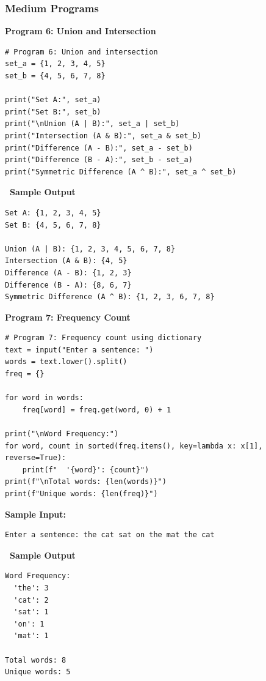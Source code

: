 \documentclass[12pt,a4paper]{article}
\newcommand{\outhead}{\noindent\colorbox{cmrgreen!25}%
  {\textbf{\small\color{cmrdark}~Sample Output~}}\par\vspace{-1pt}}
\begin{document}
\subsubsection{Medium Programs}

\textbf{Program 6: Union and Intersection}

\begin{lstlisting}
# Program 6: Union and intersection
set_a = {1, 2, 3, 4, 5}
set_b = {4, 5, 6, 7, 8}

print("Set A:", set_a)
print("Set B:", set_b)
print("\nUnion (A | B):", set_a | set_b)
print("Intersection (A & B):", set_a & set_b)
print("Difference (A - B):", set_a - set_b)
print("Difference (B - A):", set_b - set_a)
print("Symmetric Difference (A ^ B):", set_a ^ set_b)
\end{lstlisting}

\outhead
\begin{lstlisting}[style=outputstyle]
Set A: {1, 2, 3, 4, 5}
Set B: {4, 5, 6, 7, 8}

Union (A | B): {1, 2, 3, 4, 5, 6, 7, 8}
Intersection (A & B): {4, 5}
Difference (A - B): {1, 2, 3}
Difference (B - A): {8, 6, 7}
Symmetric Difference (A ^ B): {1, 2, 3, 6, 7, 8}
\end{lstlisting}

\vspace{0.5cm}

\textbf{Program 7: Frequency Count}

\begin{lstlisting}
# Program 7: Frequency count using dictionary
text = input("Enter a sentence: ")
words = text.lower().split()
freq = {}

for word in words:
    freq[word] = freq.get(word, 0) + 1

print("\nWord Frequency:")
for word, count in sorted(freq.items(), key=lambda x: x[1], reverse=True):
    print(f"  '{word}': {count}")
print(f"\nTotal words: {len(words)}")
print(f"Unique words: {len(freq)}")
\end{lstlisting}

\textbf{Sample Input:}
\begin{verbatim}
Enter a sentence: the cat sat on the mat the cat
\end{verbatim}

\outhead
\begin{lstlisting}[style=outputstyle]
Word Frequency:
  'the': 3
  'cat': 2
  'sat': 1
  'on': 1
  'mat': 1

Total words: 8
Unique words: 5
\end{lstlisting}
\end{document}
